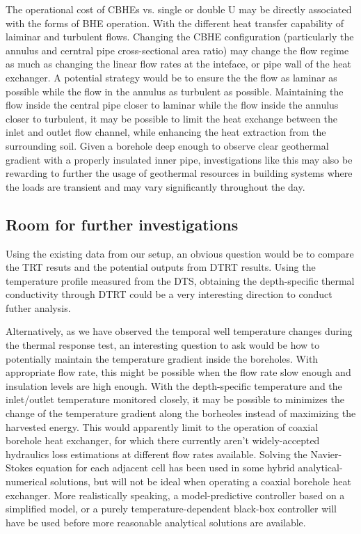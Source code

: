 	The operational cost of CBHEs vs. single or double U may be directly associated with the forms of BHE operation. With the different heat transfer capability of laiminar and turbulent flows.  Changing the CBHE configuration (particularly the annulus and cerntral pipe cross-sectional area ratio) may change the flow regime as much as changing the linear flow rates at the inteface, or pipe wall of the heat exchanger. A potential strategy would be to ensure the the flow as laminar as possible while the flow in the annulus as turbulent as possible. Maintaining the flow inside the central pipe closer to laminar while the flow inside the annulus closer to turbulent, it may be possible to limit the heat exchange between the inlet and outlet flow channel, while enhancing the heat extraction from the surrounding soil. Given a borehole deep enough to observe clear geothermal gradient with a properly insulated inner pipe, investigations like this may also be rewarding to further the usage of geothermal resources in building systems where the loads are transient and may vary significantly throughout the day. 

\subsection{Room for further investigations}
	Using the existing data from our setup, an obvious question would be to compare the TRT resuts and the potential outputs from DTRT results. Using the temperature profile measured from the DTS, obtaining the depth-specific thermal conductivity through DTRT could be a very interesting direction to conduct futher analysis.

	Alternatively, as we have observed the temporal well temperature changes during the thermal response test, an interesting question to ask would be how to potentially maintain the temperature gradient inside the boreholes. With appropriate flow rate, this might be possible when the flow rate slow enough and insulation levels are high enough. With the depth-specific temperature and the inlet/outlet temperature monitored closely, it may be possible to minimizes the change of the temperature gradient along the borheoles instead of maximizing the harvested energy. This would apparently limit to the operation of coaxial borehole heat exchanger, for which there currently aren't widely-accepted hydraulics loss estimations at different flow rates available. Solving the Navier-Stokes equation for each adjacent cell has been used in some hybrid analytical-numerical solutions, but will not be ideal when operating a coaxial borehole heat exchanger. More realistically speaking, a model-predictive controller based on a simplified model, or a purely temperature-dependent black-box controller will have be used before more reasonable analytical solutions are available. 


